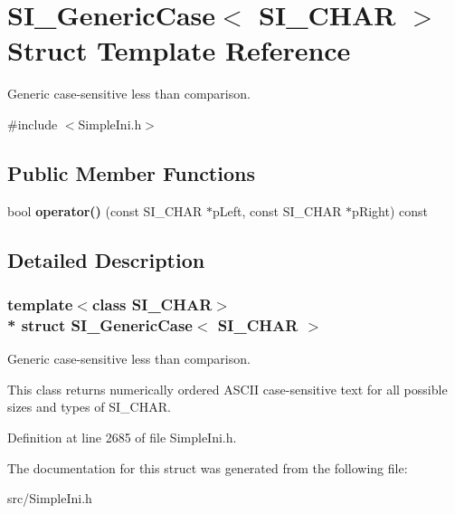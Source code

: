 \hypertarget{struct_s_i___generic_case}{}\section{S\+I\+\_\+\+Generic\+Case$<$ S\+I\+\_\+\+C\+H\+AR $>$ Struct Template Reference}
\label{struct_s_i___generic_case}


Generic case-\/sensitive less than comparison.  




{\ttfamily \#include $<$Simple\+Ini.\+h$>$}

\subsection*{Public Member Functions}
\begin{DoxyCompactItemize}
\item 
bool {\bfseries operator()} (const S\+I\+\_\+\+C\+H\+AR $\ast$p\+Left, const S\+I\+\_\+\+C\+H\+AR $\ast$p\+Right) const \hypertarget{struct_s_i___generic_case_af91c0d1b328b5c1bd15053204dcfa9b1}{}\label{struct_s_i___generic_case_af91c0d1b328b5c1bd15053204dcfa9b1}

\end{DoxyCompactItemize}


\subsection{Detailed Description}
\subsubsection*{template$<$class S\+I\+\_\+\+C\+H\+AR$>$\\*
struct S\+I\+\_\+\+Generic\+Case$<$ S\+I\+\_\+\+C\+H\+A\+R $>$}

Generic case-\/sensitive less than comparison. 

This class returns numerically ordered A\+S\+C\+II case-\/sensitive text for all possible sizes and types of S\+I\+\_\+\+C\+H\+AR. 

Definition at line 2685 of file Simple\+Ini.\+h.



The documentation for this struct was generated from the following file\+:\begin{DoxyCompactItemize}
\item 
src/Simple\+Ini.\+h\end{DoxyCompactItemize}

